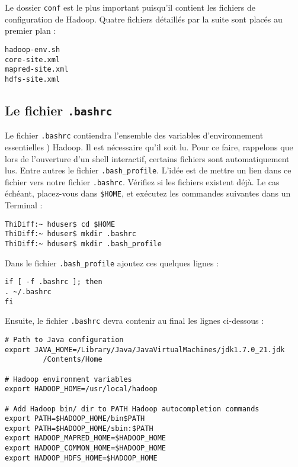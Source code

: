 \par Le dossier \texttt{conf} est le plus important puisqu'il contient les fichiers de configuration de Hadoop. Quatre fichiers détaillés par la suite sont placés au premier plan :

\begin{verbatim}
hadoop-env.sh
core-site.xml
mapred-site.xml
hdfs-site.xml
\end{verbatim}

\subsection{Le fichier \texttt{.bashrc}}

\par Le fichier \texttt{.bashrc} contiendra l'ensemble des variables d'environnement essentielles ) Hadoop. Il est nécessaire qu'il soit lu. Pour ce faire, rappelons que lors de l'ouverture d'un shell interactif, certains fichiers sont automatiquement lus. Entre autres le fichier \texttt{.bash\_profile}. L'idée est de mettre un lien dans ce fichier vers notre fichier \texttt{.bashrc}. Vérifiez si les fichiers existent déjà. Le cas échéant, placez-vous dans \texttt{\$HOME}, et exécutez les commandes suivantes dans un Terminal :

\begin{verbatim}
ThiDiff:~ hduser$ cd $HOME
ThiDiff:~ hduser$ mkdir .bashrc
ThiDiff:~ hduser$ mkdir .bash_profile
\end{verbatim}

\par Dans le fichier \texttt{.bash\_profile} ajoutez ces quelques lignes :

\begin{verbatim}
if [ -f .bashrc ]; then
. ~/.bashrc
fi
\end{verbatim}

\par Ensuite, le fichier \texttt{.bashrc} devra contenir au final les lignes ci-dessous :

\begin{verbatim}
# Path to Java configuration
export JAVA_HOME=/Library/Java/JavaVirtualMachines/jdk1.7.0_21.jdk
		 /Contents/Home

# Hadoop environment variables
export HADOOP_HOME=/usr/local/hadoop

# Add Hadoop bin/ dir to PATH Hadoop autocompletion commands
export PATH=$HADOOP_HOME/bin$PATH
export PATH=$HADOOP_HOME/sbin:$PATH
export HADOOP_MAPRED_HOME=$HADOOP_HOME
export HADOOP_COMMON_HOME=$HADOOP_HOME
export HADOOP_HDFS_HOME=$HADOOP_HOME
\end{verbatim}

